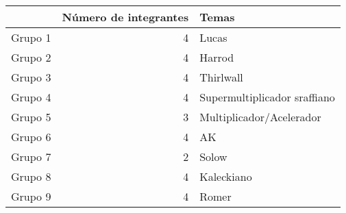 \begin{tabular}{lrl}
\toprule
{} &  Número de integrantes &                         Temas \\
\midrule
Grupo 1 &                      4 &                         Lucas \\
Grupo 2 &                      4 &                        Harrod \\
Grupo 3 &                      4 &                     Thirlwall \\
Grupo 4 &                      4 &  Supermultiplicador sraffiano \\
Grupo 5 &                      3 &      Multiplicador/Acelerador \\
Grupo 6 &                      4 &                            AK \\
Grupo 7 &                      2 &                         Solow \\
Grupo 8 &                      4 &                    Kaleckiano \\
Grupo 9 &                      4 &                         Romer \\
\bottomrule
\end{tabular}
